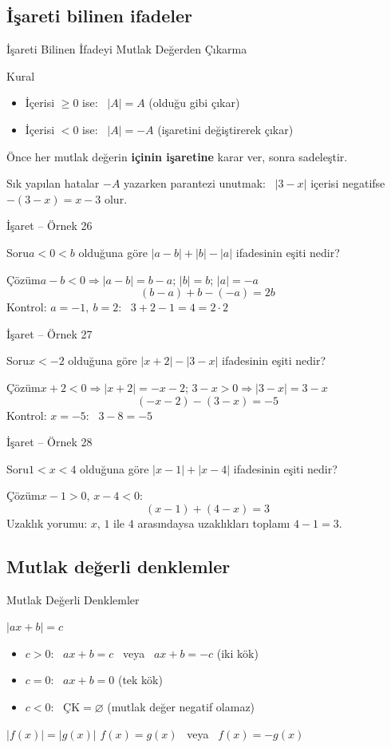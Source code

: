 \documentclass[aspectratio=169,11pt,handout]{beamer}
\newcommand{\soru}[3]{%
\begin{frame}{#1}
  \begin{block}{Soru}\large #2\end{block}
  \pause
  \begin{exampleblock}{Çözüm}\large #3\end{exampleblock}
\end{frame}}
\begin{document}
\subsection{İşareti bilinen ifadeler}
\begin{frame}{İşareti Bilinen İfadeyi Mutlak Değerden Çıkarma}
\begin{block}{Kural}
\begin{itemize}
\item İçerisi \(\ge 0\) ise: \ \(|A|=A\) \quad (olduğu gibi çıkar)
\item İçerisi \(<0\) ise: \ \(|A|=-A\) \quad (işaretini değiştirerek çıkar)
\end{itemize}
Önce her mutlak değerin \textbf{içinin işaretine} karar ver, sonra sadeleştir.
\end{block}
\begin{alertblock}{Sık yapılan hatalar}
\(-A\) yazarken parantezi unutmak: \ \(|3-x|\) içerisi negatifse \(-(3-x)=x-3\) olur.
\end{alertblock}
\end{frame}

\soru{İşaret -- Örnek 26}
{\(a<0<b\) olduğuna göre \(|a-b|+|b|-|a|\) ifadesinin eşiti nedir?}
{\(a-b<0\Rightarrow |a-b|=b-a\); \quad \(|b|=b\); \quad \(|a|=-a\)
\[(b-a)+b-(-a)=2b\]
Kontrol: \(a=-1,\ b=2\): \ \(3+2-1=4=2\cdot 2\) \ \checkmark}

\soru{İşaret -- Örnek 27}
{\(x<-2\) olduğuna göre \(|x+2|-|3-x|\) ifadesinin eşiti nedir?}
{\(x+2<0\Rightarrow |x+2|=-x-2\); \quad \(3-x>0\Rightarrow |3-x|=3-x\)
\[(-x-2)-(3-x)=-5\]
Kontrol: \(x=-5\): \ \(3-8=-5\) \ \checkmark}

\soru{İşaret -- Örnek 28}
{\(1<x<4\) olduğuna göre \(|x-1|+|x-4|\) ifadesinin eşiti nedir?}
{\(x-1>0\), \quad \(x-4<0\):
\[(x-1)+(4-x)=3\]
Uzaklık yorumu: \(x\), \(1\) ile \(4\) arasındaysa uzaklıkları toplamı \(4-1=3\).}

\subsection{Mutlak değerli denklemler}
\begin{frame}{Mutlak Değerli Denklemler}
\begin{block}{\(|ax+b|=c\)}
\begin{itemize}
\item \(c>0\): \ \(ax+b=c\) \ veya \ \(ax+b=-c\) \quad (iki kök)
\item \(c=0\): \ \(ax+b=0\) \quad (tek kök)
\item \(c<0\): \ \(\text{ÇK}=\varnothing\) \quad (mutlak değer negatif olamaz)
\end{itemize}
\end{block}
\begin{block}{\(|f(x)|=|g(x)|\)}
\(f(x)=g(x)\) \ veya \ \(f(x)=-g(x)\)
\end{block}
\end{frame}
\end{document}
